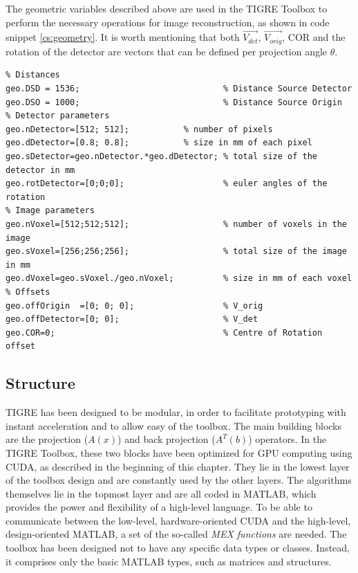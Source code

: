 The geometric variables described above are used in the TIGRE Toolbox to perform the necessary operations for image reconstruction, as shown in code snippet \ref{cs:geometry}. It is worth mentioning that both $\overrightarrow{V_{det}}$, $\overrightarrow{V_{orig}}$, COR and the rotation of the detector are vectors that can be defined per projection angle $\theta$.
\FloatBarrier
\begin{lstlisting}[style=Matlab-editor,
basicstyle=\scriptsize,
caption= Geometry definition in TIGRE,
label={cs:geometry},
frame = single
]
%% Geometry structure definition.
% Distances
geo.DSD = 1536;                      	    % Distance Source Detector
geo.DSO = 1000;                     	    % Distance Source Origin
% Detector parameters
geo.nDetector=[512; 512];		    % number of pixels 
geo.dDetector=[0.8; 0.8]; 		    % size in mm of each pixel
geo.sDetector=geo.nDetector.*geo.dDetector; % total size of the detector in mm
geo.rotDetector=[0;0;0];                    % euler angles of the rotation 
% Image parameters
geo.nVoxel=[512;512;512];                   % number of voxels in the image
geo.sVoxel=[256;256;256];                   % total size of the image in mm
geo.dVoxel=geo.sVoxel./geo.nVoxel;          % size in mm of each voxel
% Offsets
geo.offOrigin  =[0; 0; 0];                  % V_orig
geo.offDetector=[0; 0];                     % V_det
geo.COR=0;                                  % Centre of Rotation offset

\end{lstlisting}

\subsection{Structure}

TIGRE has been designed to be modular, in order to facilitate prototyping with instant acceleration and to allow easy of the toolbox. The main building blocks are the projection ($A(x)$) and back projection ($A^T(b)$) operators. In the TIGRE Toolbox, these two blocks have been optimized for GPU computing using CUDA, as described in the beginning of this chapter. They lie in the lowest layer of the toolbox design and are constantly used by the other layers. The algorithms themselves lie in the topmost layer and are all coded in MATLAB, which provides the power and flexibility of a high-level language. To be able to communicate between the low-level, hardware-oriented CUDA and the high-level, design-oriented MATLAB, a set of the so-called \textit{MEX functions} are needed. The toolbox has been designed not to have any specific data types or classes. Instead, it comprises only the basic MATLAB types, such as matrices and structures.

